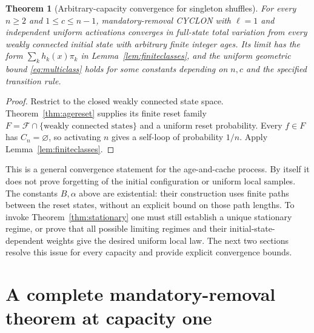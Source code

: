 \documentclass[11pt]{article}
\newtheorem{theorem}{Theorem}
\begin{document}
\begin{theorem}[Arbitrary-capacity convergence for singleton shuffles]
\label{thm:elloneconvergence}
For every $n\ge2$ and $1\le c\le n-1$, mandatory-removal CYCLON
with $\ell=1$ and independent uniform activations converges in
full-state total variation from every weakly connected initial
state with arbitrary finite integer ages. Its limit has the form
$\sum_k h_k(x)\pi_k$ in Lemma~\ref{lem:finiteclasses}, and the
uniform geometric bound \eqref{eq:multiclass} holds for some
constants depending on $n,c$ and the specified transition rule.
\end{theorem}
\begin{proof}
Restrict to the closed weakly connected state space.
Theorem~\ref{thm:agereset} supplies its finite reset family
$F=\mathcal F\cap\{\text{weakly connected states}\}$ and a uniform
reset probability. Every $f\in F$ has $C_n=\varnothing$,
so activating $n$ gives a self-loop of probability $1/n$.
Apply Lemma~\ref{lem:finiteclasses}.
\end{proof}

This is a general convergence statement for the age-and-cache
process. By itself it does not prove forgetting of the initial
configuration or uniform local samples. The constants $B,\alpha$
above are existential: their construction uses finite paths between
the reset states, without an explicit bound on those path lengths.
To invoke Theorem~\ref{thm:stationary} one must still establish a
unique stationary regime, or prove that all possible limiting
regimes and their initial-state-dependent weights give the desired
uniform local law. The next two sections resolve this issue for
every capacity and provide explicit convergence bounds.

\section{A complete mandatory-removal theorem at capacity one}
\label{sec:mandatoryone}
\end{document}
